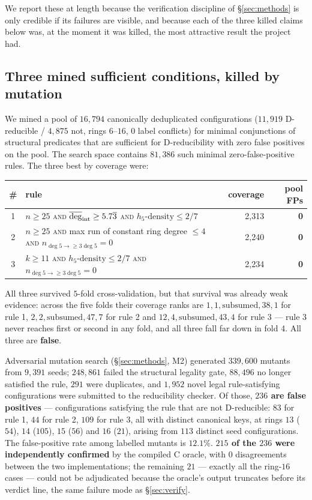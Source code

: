 \documentclass[11pt]{article}
\theoremstyle{definition}
\begin{document}
We report these at length because the verification discipline of
\S\ref{sec:methods} is only credible if its failures are visible, and because
each of the three killed claims below was, at the moment it was killed, the most
attractive result the project had.

\subsection{Three mined sufficient conditions, killed by mutation}

We mined a pool of $16{,}794$ canonically deduplicated configurations
($11{,}919$ D-reducible / $4{,}875$ not, rings $6$--$16$, $0$ label conflicts) for
minimal conjunctions of structural predicates that are sufficient for
D-reducibility with zero false positives on the pool. The search space contains
$81{,}386$ such minimal zero-false-positive rules. The three best by coverage were:

\begin{center}\small
\begin{tabular}{clrr}
\toprule
\# & rule & coverage & pool FPs \\
\midrule
1 & $n \ge 25$ \textsc{and} $\overline{\deg}_{\rm int} \ge 5.7\overline{3}$ \textsc{and} $h_5\text{-density} \le 2/7$ & 2{,}313 & \textbf{0} \\
2 & $n \ge 25$ \textsc{and} max run of constant ring degree $\le 4$ \textsc{and} $n_{\deg 5\to\ge3\deg 5} = 0$ & 2{,}240 & \textbf{0} \\
3 & $k \ge 11$ \textsc{and} $h_5\text{-density} \le 2/7$ \textsc{and} $n_{\deg 5\to\ge3\deg 5} = 0$ & 2{,}234 & \textbf{0} \\
\bottomrule
\end{tabular}
\end{center}

All three survived $5$-fold cross-validation, but that survival was already weak
evidence: across the five folds their coverage ranks are $1,1,\text{subsumed},38,1$
for rule 1, $2,2,\text{subsumed},47,7$ for rule 2 and $12,4,\text{subsumed},43,4$
for rule 3 --- rule 3 never reaches first or second in any fold, and all three fall
far down in fold 4. All three are \textbf{false}.

Adversarial mutation search (\S\ref{sec:methods}, M2) generated $339{,}600$ mutants
from $9{,}391$ seeds; $248{,}861$ failed the structural legality gate, $88{,}496$ no
longer satisfied the rule, $291$ were duplicates, and $1{,}952$ novel legal
rule-satisfying configurations were submitted to the reducibility checker. Of those,
\textbf{$236$ are false positives} --- configurations satisfying the rule that are
not D-reducible: $83$ for rule 1, $44$ for rule 2, $109$ for rule 3, all with
distinct canonical keys, at rings $13$ ($54$), $14$ ($105$), $15$ ($56$) and $16$
($21$), arising from $113$ distinct seed configurations. The false-positive rate
among labelled mutants is $12.1\%$. \textbf{$215$ of the $236$ were independently
confirmed} by the compiled C oracle, with $0$ disagreements between the two
implementations; the remaining $21$ --- exactly all the ring-$16$ cases --- could not
be adjudicated because the oracle's output truncates before its verdict line, the
same failure mode as \S\ref{sec:verify}.
\end{document}

